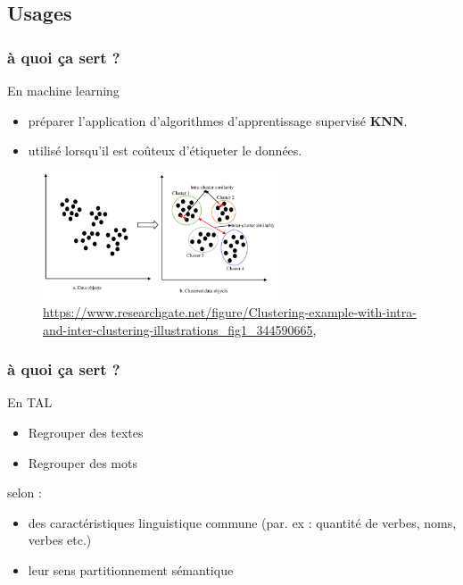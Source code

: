 \subsection{Usages}
\begin{frame}
  \frametitle{ à quoi ça sert ?}
  En machine learning
  \begin{itemize}
  \item {} préparer l’application d’algorithmes d’apprentissage supervisé  \textbf{KNN}.\\
\item {} utilisé lorsqu’il est coûteux d’étiqueter le données.
\end{itemize}

 \begin{figure}
  \includegraphics[width=7cm]{images/Clustering-example-with-intra-and-inter-clustering-illustrations.png}
  \caption{\url{https://www.researchgate.net/figure/Clustering-example-with-intra-and-inter-clustering-illustrations_fig1_344590665}, \cite{10.1007/s00521-020-05395-4}}
  \end{figure}
  
\end{frame}

\begin{frame}
  \frametitle{à quoi ça sert ?}
  En TAL
 \begin{itemize}
  \item {} Regrouper des textes
  \item {} Regrouper des mots 
  \end{itemize}
  
   selon :
  \begin{itemize}
  \item {} des caractéristiques linguistique commune (par. ex : quantité de verbes, noms, verbes etc.)
  \item {} leur sens  partitionnement sémantique
  \end{itemize}

\end{frame}

